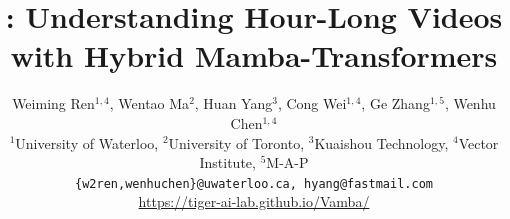 \documentclass[10pt,twocolumn,letterpaper]{article}
\title{\model: Understanding Hour-Long Videos with Hybrid Mamba-Transformers}
\author{
Weiming Ren$^{1,4}$, Wentao Ma$^2$, Huan Yang$^{3}$, Cong Wei$^{1,4}$, Ge Zhang$^{1,5}$, Wenhu Chen$^{1,4}$\\
$^{1}$University of Waterloo, $^2$University of Toronto, $^3$Kuaishou Technology, $^4$Vector Institute, $^5$M-A-P\\
{\tt\small\{w2ren,wenhuchen\}@uwaterloo.ca, hyang@fastmail.com}\\
{\normalsize \url{https://tiger-ai-lab.github.io/Vamba/}}
\vspace{-1.5em}
}
\begin{document}
\maketitle
    








{
    \small
    
    
}

 



\end{document}
